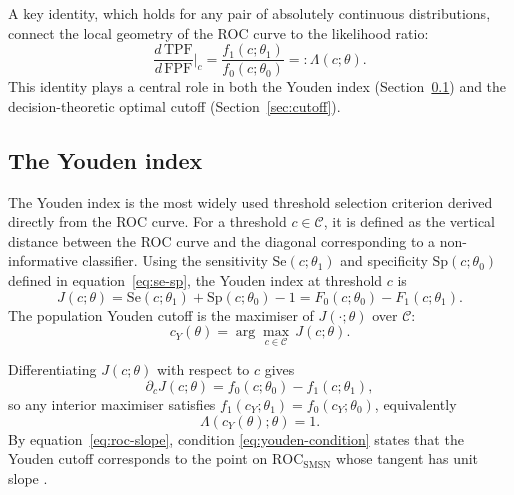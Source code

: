 \documentclass[11pt,a4paper]{article}
\theoremstyle{definition}
\theoremstyle{remark}
\newcommand{\1}{\mathbf{1}}
\begin{document}
A key identity, which holds for any pair of absolutely
continuous distributions, connect the
local geometry of the ROC curve to the likelihood ratio:
\begin{equation}
\label{eq:roc-slope}
\frac{d\,\mathrm{TPF}}{d\,\mathrm{FPF}}\bigg|_c
= \frac{f_1(c;\theta_1)}{f_0(c;\theta_0)}
=: \Lambda(c;\theta).
\end{equation}
This identity plays a central role in both the Youden index
(Section~\ref{subsec:youden}) and the decision-theoretic
optimal cutoff (Section~\ref{sec:cutoff}).


\subsection{The Youden index}
\label{subsec:youden}

The Youden index \citep{youden1950index} is the most widely
used threshold selection criterion derived directly from the
ROC curve.
For a threshold $c \in \mathcal{C}$, it is defined as the
vertical distance between the ROC curve and the diagonal
corresponding to a non-informative classifier. Using the sensitivity $\mathrm{Se}(c;\theta_1)$ and specificity
$\mathrm{Sp}(c;\theta_0)$ defined in
equation~\eqref{eq:se-sp}, the Youden index at threshold $c$ is
\begin{equation}
\label{eq:youden-index}
J(c;\theta)
= \mathrm{Se}(c; \theta_1) + \mathrm{Sp}(c;\theta_0) - 1
= F_0(c;\theta_0) - F_1(c;\theta_1).
\end{equation}
The population Youden cutoff is the maximiser of
$J(\cdot;\theta)$ over $\mathcal{C}$:
\begin{equation}
\label{eq:youden-cutoff}
c_Y(\theta)
= \arg\max_{c \in \mathcal{C}}\,J(c;\theta).
\end{equation}

\noindent
Differentiating $J(c;\theta)$ with respect to $c$ gives
\[
\partial_c J(c;\theta)
= f_0(c;\theta_0) - f_1(c;\theta_1),
\]
so any interior maximiser satisfies
$f_1(c_Y;\theta_1) = f_0(c_Y;\theta_0)$, equivalently
\begin{equation}
\label{eq:youden-condition}
\Lambda(c_Y(\theta);\theta) = 1.
\end{equation}
By equation~\eqref{eq:roc-slope}, condition
\eqref{eq:youden-condition} states that the Youden cutoff
corresponds to the point on
$\mathrm{ROC}_{\mathrm{SMSN}}$ whose tangent has
unit slope \citep{metz1978basic, pepe2003statistical}.
\end{document}
